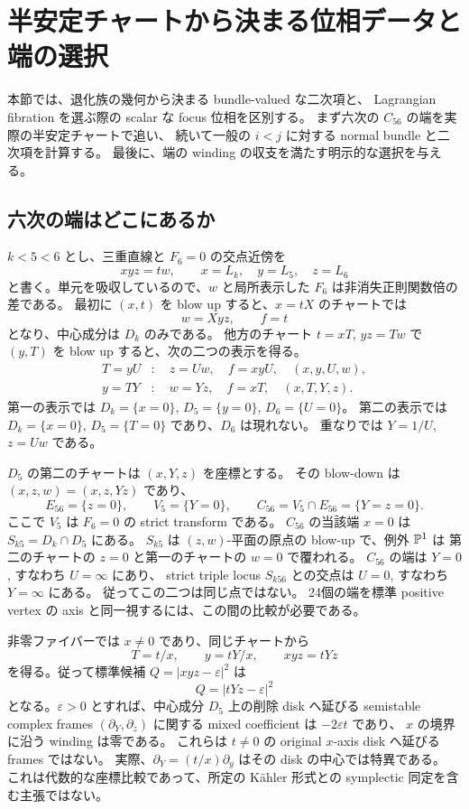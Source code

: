\section{半安定チャートから決まる位相データと端の選択}\label{sc:phase}

本節では、退化族の幾何から決まる bundle-valued な二次項と、
Lagrangian fibration を選ぶ際の scalar な focus 位相を区別する。
まず六次の $C_{56}$ の端を実際の半安定チャートで追い、
続いて一般の $i<j$ に対する normal bundle と二次項を計算する。
最後に、端の winding の収支を満たす明示的な選択を与える。

\subsection{六次の端はどこにあるか}

$k<5<6$ とし、三重直線と $F_6=0$ の交点近傍を
\[
 xyz=tw,\qquad x=L_k,\quad y=L_5,\quad z=L_6
\]
と書く。単元を吸収しているので、$w$ と局所表示した $F_6$ は非消失正則関数倍の差である。
最初に $(x,t)$ を blow up すると、$x=tX$ のチャートでは
\[
 w=Xyz,\qquad f=t
\]
となり、中心成分は $D_k$ のみである。
他方のチャート $t=xT$, $yz=Tw$ で $(y,T)$ を blow up すると、次の二つの表示を得る。
\begin{align*}
 T=yU &: \quad z=Uw,\quad f=xyU,\quad (x,y,U,w),\\
 y=TY &: \quad w=Yz,\quad f=xT,\quad (x,T,Y,z).
\end{align*}
第一の表示では $D_k=\{x=0\}$, $D_5=\{y=0\}$, $D_6=\{U=0\}$。
第二の表示では $D_k=\{x=0\}$, $D_5=\{T=0\}$ であり、$D_6$ は現れない。
重なりでは $Y=1/U$, $z=Uw$ である。

$D_5$ の第二のチャートは $(x,Y,z)$ を座標とする。
その blow-down は $(x,z,w)=(x,z,Yz)$ であり、
\begin{equation}\label{sc:sextic-chart}
 E_{56}=\{z=0\},\qquad V_5=\{Y=0\},\qquad
 C_{56}=V_5\cap E_{56}=\{Y=z=0\}.
\end{equation}
ここで $V_5$ は $F_6=0$ の strict transform である。
$C_{56}$ の当該端 $x=0$ は $S_{k5}=D_k\cap D_5$ にある。
$S_{k5}$ は $(z,w)$-平面の原点の blow-up で、例外 $\mathbb P^1$ は
第二のチャートの $z=0$ と第一のチャートの $w=0$ で覆われる。
$C_{56}$ の端は $Y=0$, すなわち $U=\infty$ にあり、
strict triple locus $S_{k56}$ との交点は $U=0$, すなわち $Y=\infty$ にある。
従ってこの二つは同じ点ではない。
24個の端を標準 positive vertex の axis と同一視するには、この間の比較が必要である。

非零ファイバーでは $x\ne0$ であり、同じチャートから
\begin{equation}\label{sc:nonzero-chart}
 T=t/x,\qquad y=tY/x,\qquad xyz=tYz
\end{equation}
を得る。従って標準候補 $Q=|xyz-\varepsilon|^2$ は
\[
 Q=|tYz-\varepsilon|^2
\]
となる。$\varepsilon>0$ とすれば、中心成分 $D_5$ 上の削除 disk へ延びる
semistable complex frames $(\partial_Y,\partial_z)$ に関する mixed coefficient は $-2\varepsilon t$ であり、
$x$ の境界に沿う winding は零である。
これらは $t\ne0$ の original $x$-axis disk へ延びる frames ではない。
実際、$\partial_Y=(t/x)\partial_y$ はその disk の中心では特異である。
これは代数的な座標比較であって、所定の Kähler 形式との symplectic 同定を含む主張ではない。


